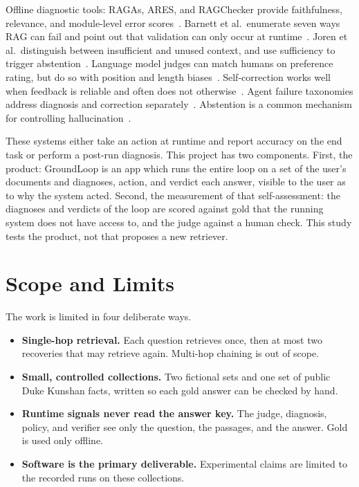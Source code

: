 \documentclass[12pt, a4paper, oneside]{report}
\begin{document}
Offline diagnostic tools: RAGAs, ARES, and RAGChecker provide faithfulness,
relevance, and module-level error
scores~\cite{es2024ragas,saadfalcon2024ares,ru2024ragchecker}. Barnett et
al.\ enumerate seven ways RAG can fail and point out that validation can
only occur at runtime~\cite{barnett2024sevenfailure}. Joren et al.\
distinguish between insufficient and unused context, and use sufficiency
to trigger abstention~\cite{joren2025sufficient}. Language model judges can
match humans on preference rating, but do so with position and length
biases~\cite{zheng2023judging,wang2024fair}. Self-correction works well when
feedback is reliable and often does not
otherwise~\cite{huang2024cannot,kamoi2024selfcorrection,shinn2023reflexion}.
Agent failure taxonomies address diagnosis and correction
separately~\cite{cemri2025mast,zhu2025agentdebug}. Abstention is a common
mechanism for controlling hallucination~\cite{wen2025abstention}.

These systems either take an action at runtime and report accuracy on the
end task or perform a post-run diagnosis. This project has two components.
First, the product: GroundLoop is an app which runs the entire loop on a set
of the user's documents and diagnoses, action, and verdict each answer,
visible to the user as to why the system acted. Second, the measurement of
that self-assessment: the diagnoses and verdicts of the loop are scored
against gold that the running system does not
have access to, and the judge against a human check. This study tests the
product, not that proposes a new retriever.

\section{Scope and Limits}

The work is limited in four deliberate ways.

\begin{itemize}
\item \textbf{Single-hop retrieval.} Each question retrieves once, then
  at most two recoveries that may retrieve again. Multi-hop chaining is
  out of scope.
\item \textbf{Small, controlled collections.} Two fictional sets and one
  set of public Duke Kunshan facts, written so each gold answer can be
  checked by hand.
\item \textbf{Runtime signals never read the answer key.} The judge,
  diagnosis, policy, and verifier see only the question, the passages,
  and the answer. Gold is used only offline.
\item \textbf{Software is the primary deliverable.} Experimental claims
  are limited to the recorded runs on these collections.
\end{itemize}
\end{document}
